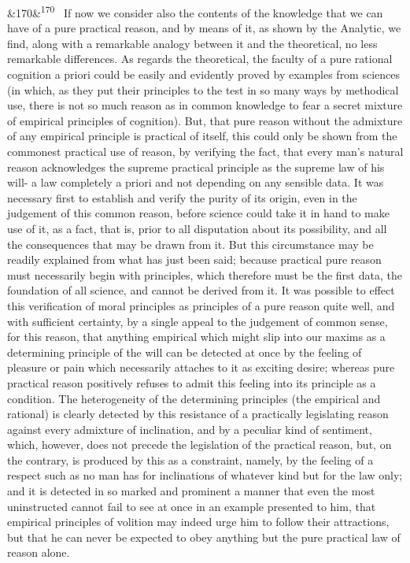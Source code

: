 \documentclass[12pt]{article}
\newcommand{\para}[1][]{\par\noindent\ifx&#1&\else\textsuperscript{\footnotesize #1}~\fi}
\begin{document}
\para[170] If now we consider also the contents of the knowledge that we can have of a pure practical reason, and by means of it, as shown by the Analytic, we find, along with a remarkable analogy between it and the theoretical, no less remarkable differences. As regards the theoretical, the faculty of a pure rational cognition a priori could be easily and evidently proved by examples from sciences (in which, as they put their principles to the test in so many ways by methodical use, there is not so much reason as in common knowledge to fear a secret mixture of empirical principles of cognition). But, that pure reason without the admixture of any empirical principle is practical of itself, this could only be shown from the commonest practical use of reason, by verifying the fact, that every man's natural reason acknowledges the supreme practical principle as the supreme law of his will- a law completely a priori and not depending on any sensible data. It was necessary first to establish and verify the purity of its origin, even in the judgement of this common reason, before science could take it in hand to make use of it, as a fact, that is, prior to all disputation about its possibility, and all the consequences that may be drawn from it. But this circumstance may be readily explained from what has just been said; because practical pure reason must necessarily begin with principles, which therefore must be the first data, the foundation of all science, and cannot be derived from it. It was possible to effect this verification of moral principles as principles of a pure reason quite well, and with sufficient certainty, by a single appeal to the judgement of common sense, for this reason, that anything empirical which might slip into our maxims as a determining principle of the will can be detected at once by the feeling of pleasure or pain which necessarily attaches to it as exciting desire; whereas pure practical reason positively refuses to admit this feeling into its principle as a condition. The heterogeneity of the determining principles (the empirical and rational) is clearly detected by this resistance of a practically legislating reason against every admixture of inclination, and by a peculiar kind of sentiment, which, however, does not precede the legislation of the practical reason, but, on the contrary, is produced by this as a constraint, namely, by the feeling of a respect such as no man has for inclinations of whatever kind but for the law only; and it is detected in so marked and prominent a manner that even the most uninstructed cannot fail to see at once in an example presented to him, that empirical principles of volition may indeed urge him to follow their attractions, but that he can never be expected to obey anything but the pure practical law of reason alone.
\end{document}
